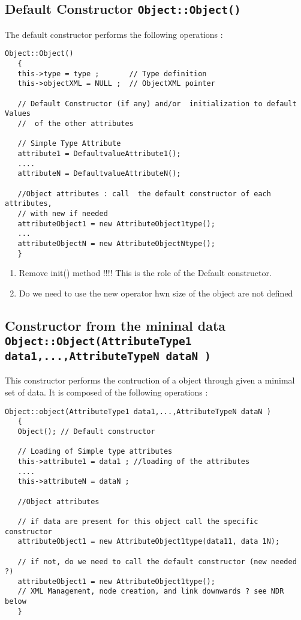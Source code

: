 \subsection{Default Constructor {\tt Object::Object() } }

The default constructor performs the following operations :
\begin{verbatim}
Object::Object()
   {
   this->type = type ;       // Type definition 
   this->objectXML = NULL ;  // ObjectXML pointer

   // Default Constructor (if any) and/or  initialization to default Values
   //  of the other attributes

   // Simple Type Attribute
   attribute1 = DefaultvalueAttribute1();
   ....
   attributeN = DefaultvalueAttributeN();

   //Object attributes : call  the default constructor of each attributes, 
   // with new if needed
   attributeObject1 = new AttributeObject1type();
   ...
   attributeObjectN = new AttributeObjectNtype();
   }
\end{verbatim} 

\begin{ndr}
  \begin{enumerate}
  \item Remove init() method !!!! This is the role of the Default constructor.
  \item Do we need to use the new operator hwn size of the object are not defined 
  \end{enumerate}

\end{ndr}

\subsection{Constructor from the mininal data {\small \tt Object::Object(AttributeType1 data1,...,AttributeTypeN dataN ) }}

This constructor performs  the contruction of a object through given a minimal set of data.  It is composed of the following operations :

\begin{verbatim}
Object::object(AttributeType1 data1,...,AttributeTypeN dataN )
   {
   Object(); // Default constructor

   // Loading of Simple type attributes
   this->attribute1 = data1 ; //loading of the attributes
   ....
   this->attributeN = dataN ;

   //Object attributes

   // if data are present for this object call the specific constructor
   attributeObject1 = new AttributeObject1type(data11, data 1N);

   // if not, do we need to call the default constructor (new needed ?)
   attributeObject1 = new AttributeObject1type();
   // XML Management, node creation, and link downwards ? see NDR below
   }
\end{verbatim} 


